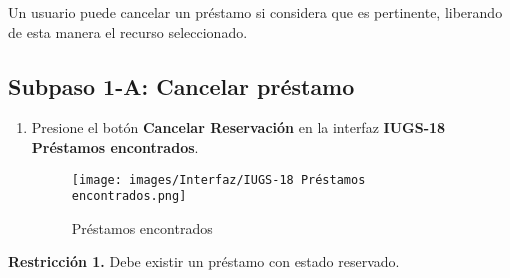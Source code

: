 Un usuario puede cancelar un préstamo si considera que es pertinente, liberando de esta manera
el recurso seleccionado.

\subsection{Subpaso 1-A: Cancelar préstamo}
\begin{enumerate}
	\item Presione el botón \textbf{Cancelar Reservación} en la interfaz
    \textbf{IUGS-18 Préstamos encontrados}.
    \begin{figure}[hbtp]
	\texttt{[image: images/Interfaz/IUGS-18 Préstamos encontrados.png]}
	\caption{Préstamos encontrados}
	\end{figure}
\end{enumerate}

\textbf{Restricción 1.} Debe existir un préstamo con estado reservado.
